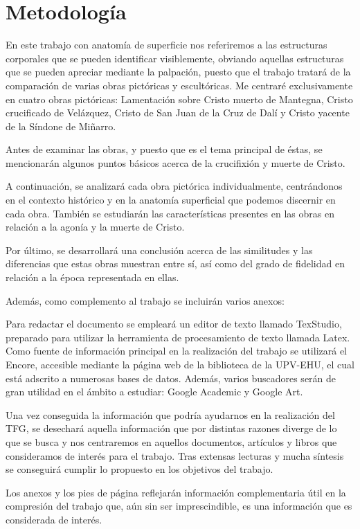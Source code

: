 \section{Metodología}
En este trabajo con anatomía de superficie nos referiremos a las estructuras corporales que se pueden identificar visiblemente, obviando aquellas estructuras que se pueden apreciar mediante la palpación, puesto que el trabajo tratará de la comparación de varias obras pictóricas y escultóricas. Me centraré exclusivamente en cuatro obras pictóricas: Lamentación sobre Cristo muerto de Mantegna, Cristo crucificado de Velázquez,  %
Cristo de San Juan de la Cruz de Dalí y Cristo yacente de la Síndone de Miñarro.


Antes de examinar las obras, y puesto que es el tema principal de éstas, se mencionarán algunos puntos básicos acerca de la crucifixión y muerte de Cristo.

A continuación, se analizará cada obra pictórica individualmente, centrándonos en el contexto histórico y en la anatomía superficial que podemos discernir en cada obra. También se estudiarán las características presentes en las obras en relación a la agonía y la muerte de Cristo.

Por último, se desarrollará una conclusión acerca de las similitudes y las diferencias que estas obras muestran entre sí, así como del grado de fidelidad en relación a la época representada en ellas.

Además, como complemento al trabajo se incluirán varios anexos:

\vspace{12pt}

Para redactar el documento se empleará un editor de texto llamado TexStudio, preparado para utilizar la herramienta de procesamiento de texto llamada Latex. Como fuente de información principal en la realización del trabajo se utilizará el Encore, accesible mediante la página web de la biblioteca de la UPV-EHU, el cual está adscrito a numerosas bases de datos. Además, varios buscadores serán de gran utilidad en el ámbito a estudiar: Google Academic y Google Art.

Una vez conseguida la información que podría ayudarnos en la realización del TFG, se desechará aquella información que por distintas razones diverge de lo que se busca y nos centraremos en aquellos documentos, artículos y libros que consideramos de interés para el trabajo. Tras extensas lecturas y mucha síntesis se conseguirá cumplir lo propuesto en los objetivos del trabajo.

Los anexos y los pies de página reflejarán información complementaria útil en la compresión del trabajo que, aún sin ser imprescindible, es una información que es considerada de interés.